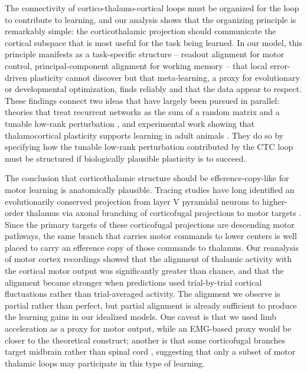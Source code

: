 \documentclass[11pt]{article}
\begin{document}
The connectivity of cortico-thalamo-cortical loops must be organized
for the loop to contribute to learning, and our analysis shows that
the organizing principle is remarkably simple: the corticothalamic
projection should communicate the cortical subspace that is most useful
for the task being learned. In our model, this principle manifests
as a task-specific structure -- readout alignment for motor control,
principal-component alignment for working memory -- that local
error-driven plasticity cannot discover but that meta-learning, a
proxy for evolutionary or developmental optimization, finds reliably
and that the data appear to respect. These findings connect two ideas
that have largely been pursued in parallel: theories that treat
recurrent networks as the sum of a random matrix and a tunable
low-rank perturbation \cite{mastrogiuseppe2018linking}, and
experimental work showing that thalamocortical plasticity supports
learning in adult animals \cite{hasegawa2018thalamocortical}. They do
so by specifying how the tunable low-rank perturbation contributed by
the CTC loop must be structured if biologically plausible plasticity
\cite{murray2019local, lillicrap2016random, gerstner2018eligibility}
is to succeed.

The conclusion that corticothalamic structure should be efference-copy-like
for motor learning is anatomically plausible. Tracing studies have long
identified an evolutionarily conserved projection from layer V
pyramidal neurons to higher-order thalamus via axonal branching of
corticofugal projections to motor targets \cite{yamawaki2015synaptic,
economo2018distinct}. Since the primary targets of these corticofugal
projections are descending motor pathways, the same branch that carries
motor commands to lower centers is well placed to carry an efference
copy of those commands to thalamus. Our reanalysis of motor cortex
recordings \cite{sauerbrei2020cortical} showed that the alignment of
thalamic activity with the cortical motor output was significantly
greater than chance, and that the alignment became stronger when
predictions used trial-by-trial cortical fluctuations rather than
trial-averaged activity. The alignment we observe is partial rather
than perfect, but partial alignment is already sufficient to produce
the learning gains in our idealized models. One caveat is that we used
limb acceleration as a proxy for motor output, while an EMG-based
proxy would be closer to the theoretical construct; another is that
some corticofugal branches target midbrain rather than spinal cord
\cite{economo2018distinct}, suggesting that only a subset of motor
thalamic loops may participate in this type of learning.
\end{document}
